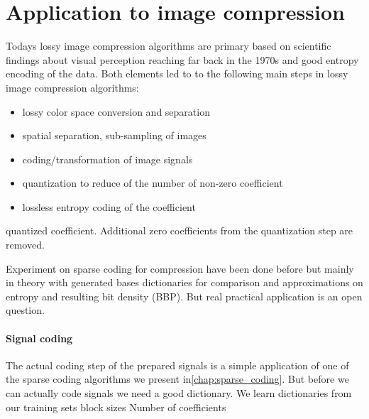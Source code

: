 \section{Application to image compression}
Todays lossy image compression algorithms are primary based on scientific
findings about visual perception reaching far back in the 1970s\cite{?} and
good entropy encoding of the data. Both elements led to to the
following main steps in lossy image compression algorithms:
\begin{itemize}
 \item lossy color space conversion and separation
 \item spatial separation, sub-sampling of images
 \item coding/transformation of image signals
 \item quantization to reduce of the number of non-zero coefficient 
 \item lossless entropy coding of the coefficient 
\end{itemize}

quantized coefficient. Additional zero coefficients from the quantization step
are removed.


Experiment on sparse coding for compression have been done before but mainly in
theory with generated bases dictionaries for comparison and approximations on
entropy and resulting bit density (BBP). But real practical application is an
open question.



\paragraph{Signal coding}
The actual coding step of the prepared signals is a simple application of one
of the sparse coding algorithms we present in\ref{chap:sparse_coding}.
But before we can actually code signals we need a good dictionary.
We learn dictionaries from our training sets 
block sizes
Number of coefficients


